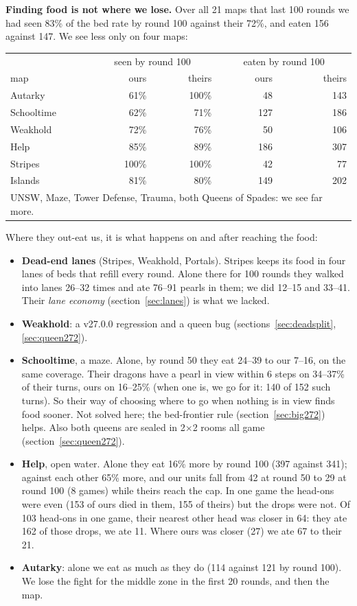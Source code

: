 \documentclass[11pt,a4paper]{article}
\begin{document}
\textbf{Finding food is not where we lose.} Over all 21 maps that last 100 rounds we had seen 83\% of the bed rate by
round 100 against their 72\%, and eaten 156 against 147. We see less only on four maps:
\begin{center}
\begin{tabular}{lrrrr}
  & \multicolumn{2}{c}{seen by round 100} & \multicolumn{2}{c}{eaten by round 100} \\
  map & ours & theirs & ours & theirs \\ \hline
  Autarky & 61\% & 100\% & 48 & 143 \\
  Schooltime & 62\% & 71\% & 127 & 186 \\
  Weakhold & 72\% & 76\% & 50 & 106 \\
  Help & 85\% & 89\% & 186 & 307 \\ \hline
  Stripes & 100\% & 100\% & 42 & 77 \\
  Islands & 81\% & 80\% & 149 & 202 \\ \hline
  \multicolumn{5}{l}{UNSW, Maze, Tower Defense, Trauma, both Queens of Spades: we see far more.} \\
\end{tabular}
\end{center}
Where they out-eat us, it is what happens on and after reaching the food:
\begin{itemize}
  \item \textbf{Dead-end lanes} (Stripes, Weakhold, Portals). Stripes keeps its food in four lanes of beds that refill every
        round. Alone there for 100 rounds they walked into lanes 26--32 times and ate 76--91 pearls in them; we did 12--15
        and 33--41. Their \emph{lane economy} (section~\ref{sec:lanes}) is what we lacked.
  \item \textbf{Weakhold}: a v27.0.0 regression and a queen bug (sections~\ref{sec:deadsplit}, \ref{sec:queen272}).
  \item \textbf{Schooltime}, a maze. Alone, by round 50 they eat 24--39 to our 7--16, on the same coverage. Their dragons have
        a pearl in view within 6 steps on 34--37\% of their turns, ours on 16--25\% (when one is, we go for it: 140 of 152
        such turns). So their way of choosing where to go when nothing is in view finds food sooner. Not solved here; the
        bed-frontier rule (section~\ref{sec:big272}) helps. Also both queens are sealed in 2$\times$2 rooms all game
        (section~\ref{sec:queen272}).
  \item \textbf{Help}, open water. Alone they eat 16\% more by round 100 (397 against 341); against each other 65\% more,
        and our units fall from 42 at round 50 to 29 at round 100 (8 games) while theirs reach the cap. In one game the
        head-ons were even (153 of ours died in them, 155 of theirs) but the drops were not. Of 103 head-ons in one game, their nearest other head was closer in 64:
        they ate 162 of those drops, we ate 11. Where ours was closer (27) we ate 67 to their 21.
  \item \textbf{Autarky}: alone we eat as much as they do (114 against 121 by round 100). We lose the fight for the middle
        zone in the first 20 rounds, and then the map.
\end{itemize}
\end{document}
